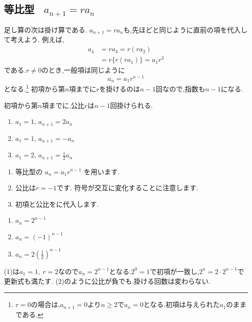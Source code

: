 
  \subsection{\texorpdfstring{等比型 \, $a_{n+1}=ra_n$}{等比型}}\label{節：等比型}
    足し算の次は掛け算である.
    $a_{n+1}=ra_n$も,先ほどと同じように直前の項を代入して考えよう.
    例えば,
    \begin{align*}
      a_4&=ra_3=r(ra_2)\\
         &=r\{r(ra_1)\}=a_1r^3
    \end{align*}
    である.$r\ne0$のとき,一般項は同じように
    \[
      a_n=a_1r^{n-1}
    \]
    となる.\footnote{$r=0$の場合は,$a_{n+1}=0$より$n\ge2$で$a_n=0$となる.初項は与えられた$a_1$のままである.}
    初項から第$n$項までに$r$を掛けるのは$n-1$回なので,指数も$n-1$になる.
  \begin{bookpoint}
    初項から第$n$項までに,公比$r$は$n-1$回掛けられる.
  \end{bookpoint}

    \noindent {}\par\nobreak
    \begin{enumerate}[label=(\arabic*),parsep=3pt,format=\bookitemlink{example-geometric-1}{problem}{answer}]
      \item $\displaystyle a_1=1,\, a_{n+1}=2a_n$
      \item $\displaystyle a_1=1,\, a_{n+1}=-a_n$
      \item $\displaystyle a_1=2,\, a_{n+1}=\frac{1}{2}a_n$
    \end{enumerate}

    \noindent{}\par\nobreak
    \begin{enumerate}[label=(\arabic*),parsep=3pt,format=\bookitemlink{example-geometric-1}{hint}{problem}]
      \item 等比型の
            $\displaystyle a_n=a_1r^{n-1}$
            を用います.
      \item 公比は$r=-1$です.
            符号が交互に変化することに注意します.
      \item 初項と公比をに代入します.
    \end{enumerate}

    \noindent{}\par\nobreak
    \begin{enumerate}[label=(\arabic*),parsep=3pt,format=\bookitemlink{example-geometric-1}{answer}{problem}]
      \item $\displaystyle a_n=2^{n-1}$
      \item $\displaystyle a_n=(-1)^{n-1}$
      \item $\displaystyle a_n=2\left(\frac12\right)^{n-1}$
    \end{enumerate}

    \noindent{}\par\nobreak
    (1)は$a_1=1,\ r=2$なので$a_n=2^{n-1}$となる.$2^0=1$で初項が一致し,$2^n=2\cdot2^{n-1}$で更新式も満たす.
    (2)のように公比が負でも,掛ける回数は変わらない.
